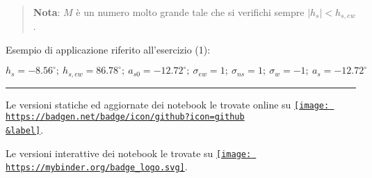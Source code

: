 \documentclass[11pt]{article}
\begin{document}
    \begin{quote}
\textbf{Nota}: \(M\) è un numero molto grande tale che si verifichi
sempre \(|h_s|< h_{s,ew}\).
\end{quote}

    Esempio di applicazione riferito all'esercizio (1):
 
            
    
    \(h_s = -8.56^{\circ}; \ h_{s,ew} = 86.78^{\circ}; \ a_{s0} = -12.72^{\circ}; \ \sigma_{ew} = 1; \ \sigma_{ns} = 1; \ \sigma_w = -1; \ a_s = -12.72^{\circ}\)

    

    \begin{center}\rule{0.5\linewidth}{0.5pt}\end{center}

Le versioni statiche ed aggiornate dei notebook le trovate online su
\href{https://github.com/DSSchiera/materials}{\texttt{[image: https://badgen.net/badge/icon/github?icon=github\\\&label]}}.

Le versioni interattive dei notebook le trovate su
\href{https://mybinder.org/v2/gh/DSSchiera/materials/HEAD}{\texttt{[image: https://mybinder.org/badge\_logo.svg]}}.


    
    
    
\end{document}
